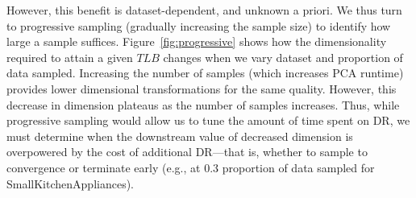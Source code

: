 However, this benefit is dataset-dependent, and unknown a priori.
We thus turn to progressive sampling (gradually increasing the sample size) to identify how large a sample suffices.
Figure~\ref{fig:progressive} shows how the dimensionality required to attain a given $TLB$ changes when we vary dataset and proportion of data sampled.
Increasing the number of samples (which increases PCA runtime) provides lower dimensional transformations for the same quality.
However, this decrease in dimension plateaus as the number of samples increases.
Thus, while progressive sampling would allow us to tune the amount of time spent on DR, we must determine when the downstream value of decreased dimension is overpowered by the cost of additional DR---that is, whether to sample to convergence or terminate early (e.g., at $0.3$ proportion of data sampled for SmallKitchenAppliances). 






